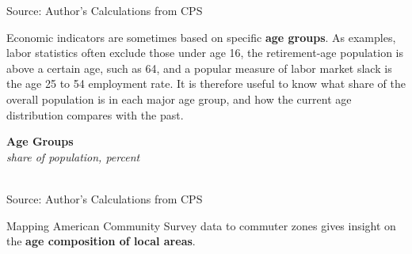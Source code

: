 \documentclass{report}
\newcommand{\tbllink}[1]{\href{https://raw.githubusercontent.com/bdecon/US-chartbook/master/chartbook/data/#1}{\faTable}}
\newcommand{\barylab}[2]{yticklabel style={text width=#1, align=right, 
		style={black!70}, text height=#2},}
\newcommand{\bbar}[2]{extra #1 ticks = {{#2}}, extra #1 tick labels = ,
		extra #1 tick style = {grid=major, grid style={thick, black!25}},}
\newcommand{\barplotnogrid}{xbar=0pt, axis line style={draw=none},
	    yticklabel style={align=left, anchor=east},
      		xmajorticks=false, ymajorgrids=false,   
	    ytick=data, tickwidth=0pt, area legend, reverse legend,
	    nodes near coords align={horizontal},}
\begin{document}
{\begin{minipage}{1.0\textwidth}
\begin{minipage}{0.53\textwidth}
\footnotesize{Source: Author's Calculations from CPS} \hfill \tbllink{median_age.csv}
\end{minipage}
\vspace{3mm}

\small Economic indicators are sometimes based on specific \textbf{age groups}. As examples, labor statistics often exclude those under age 16, the retirement-age population is above a certain age, such as 64, and a popular measure of labor market slack is the age 25 to 54 employment rate. It is therefore useful to know what share of the overall population is in each major age group, and how the current age distribution compares with the past. 
\end{minipage}
\vspace{0.5mm}

\begin{minipage}{0.35\textwidth}
\normalsize \textbf{Age Groups}\\
\footnotesize{\textit{share of population, percent}}\\
\hspace*{-4mm} \\
\footnotesize{Source: Author's Calculations from CPS}
\end{minipage} \hspace{4.5mm}
\begin{minipage}{0.37\textwidth}
\small 
\end{minipage}
\newpage
\begin{minipage}{1.0\textwidth} 
\small Mapping American Community Survey data to commuter zones gives insight on the \textbf{age composition of local areas}.  


\end{minipage}}
\end{document}
